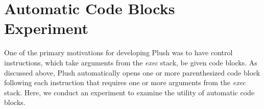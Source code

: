 \documentclass[graybox]{svmult}
\begin{document}










\section{Automatic Code Blocks Experiment}

One of the primary motivations for developing Plush was to have control instructions, which take arguments from the \textit{exec} stack, be given code blocks. As discussed above, Plush automatically opens one or more parenthesized code block following each instruction that requires one or more arguments from the \textit{exec} stack. Here, we conduct an experiment to examine the utility of automatic code blocks.
\end{document}
